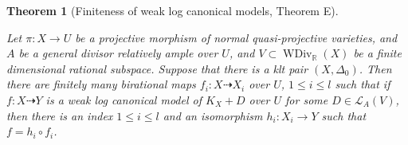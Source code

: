 \documentclass[11pt]{amsart}
\newtheorem{thm}[defn]{Theorem}
\begin{document}
\begin{thm}[Finiteness of weak log canonical models, \cite{BCHM10} Theorem E]\label{finitewlcm}

   Let $\pi:X\to U$ be a projective morphism of normal quasi-projective varieties, and $A$ be a general divisor relatively ample over $U$, and $V \subset \operatorname{WDiv}_{\mathbb{R}}(X)$ be a finite dimensional rational subspace. Suppose that there is a klt pair $(X,\Delta_{0})$. Then there are finitely many birational maps $f_{i}:X \dashrightarrow X_{i}$ over $U$, $1\leqslant i\leqslant l$ such that if $f:X \dashrightarrow  Y$ is a weak log canonical model of $K_{X}+D$ over $U$ for some $D \in \mathcal{L}_{A}(V)$, then there is an index $1\leqslant i\leqslant l$ and an  isomorphism  $h_{i}:X_{i} \to Y$  such that $f=h_{i}\circ f_{i}$.  

\end{thm}
\end{document}
